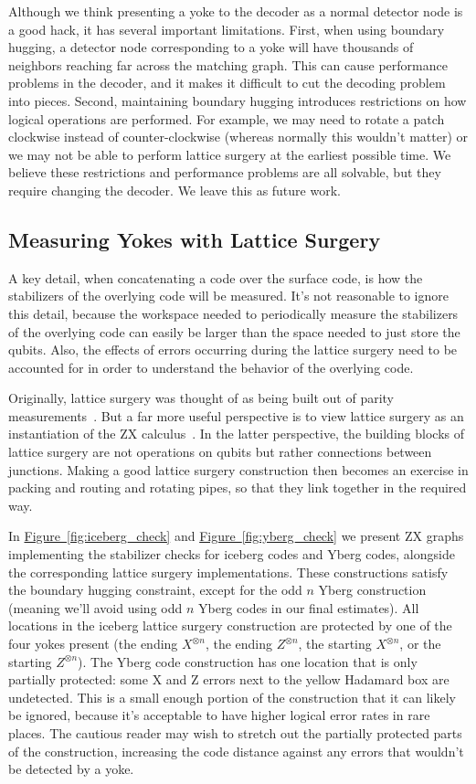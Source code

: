 \documentclass[onecolumn,unpublished,a4paper]{quantumarticle}
\theoremstyle{definition}
\theoremstyle{definition}
\theoremstyle{definition}
\newcommand{\fig}[1]{\hyperref[fig:#1]{Figure~\ref*{fig:#1}}}
\begin{document}
Although we think presenting a yoke to the decoder as a normal detector node is a good hack, it has several important limitations.
First, when using boundary hugging, a detector node corresponding to a yoke will have thousands of neighbors reaching far across the matching graph.
This can cause performance problems in the decoder, and it makes it difficult to cut the decoding problem into pieces.
Second, maintaining boundary hugging introduces restrictions on how logical operations are performed.
For example, we may need to rotate a patch clockwise instead of counter-clockwise (whereas normally this wouldn't matter) or we may not be able to perform lattice surgery at the earliest possible time.
We believe these restrictions and performance problems are all solvable, but they require changing the decoder.
We leave this as future work.


\subsection{Measuring Yokes with Lattice Surgery}

A key detail, when concatenating a code over the surface code, is how the stabilizers of the overlying code will be measured.
It's not reasonable to ignore this detail, because the workspace needed to periodically measure the stabilizers of the overlying code can easily be larger than the space needed to just store the qubits.
Also, the effects of errors occurring during the lattice surgery need to be accounted for in order to understand the behavior of the overlying code.

Originally, lattice surgery was thought of as being built out of parity measurements~\cite{horsman2012latticesurgery,fowler2018latticesurgery}.
But a far more useful perspective is to view lattice surgery as an instantiation of the ZX calculus~\cite{de2017zxlattice}.
In the latter perspective, the building blocks of lattice surgery are not operations on qubits but rather connections between junctions.
Making a good lattice surgery construction then becomes an exercise in packing and routing and rotating pipes, so that they link together in the required way.

In \fig{iceberg_check} and \fig{yberg_check} we present ZX graphs implementing the stabilizer checks for iceberg codes and Yberg codes, alongside the corresponding lattice surgery implementations.
These constructions satisfy the boundary hugging constraint, except for the odd $n$ Yberg construction (meaning we'll avoid using odd $n$ Yberg codes in our final estimates).
All locations in the iceberg lattice surgery construction are protected by one of the four yokes present (the ending $X^{\otimes n}$, the ending $Z^{\otimes n}$, the starting $X^{\otimes n}$, or the starting $Z^{\otimes n}$).
The Yberg code construction has one location that is only partially protected: some X and Z errors next to the yellow Hadamard box are undetected.
This is a small enough portion of the construction that it can likely be ignored, because it's acceptable to have higher logical error rates in rare places.
The cautious reader may wish to stretch out the partially protected parts of the construction, increasing the code distance against any errors that wouldn't be detected by a yoke.
\end{document}
